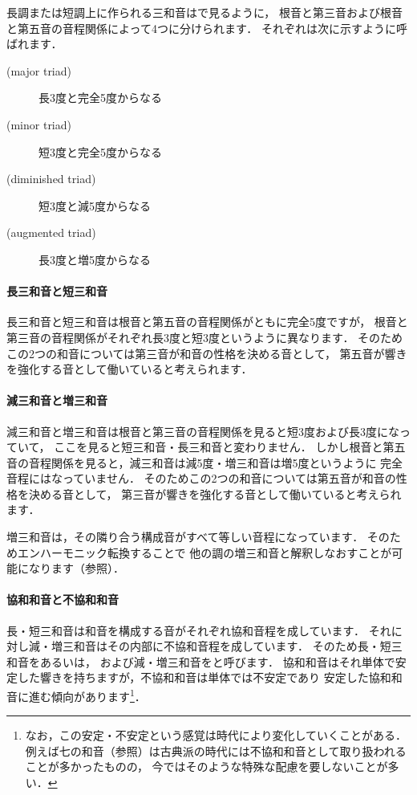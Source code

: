 \documentclass[dvipdfmx,uplatex,b5paper,openany,jbase=12Q,nomag*,textwidth-limit=44%
               ]{gachimuchi}[2020/05/05]
\begin{document}
長調または短調上に作られる三和音はで見るように，
根音と第三音および根音と第五音の音程関係によって4つに分けられます．
それぞれは次に示すように呼ばれます．
\begin{description}
  \item[\xkanjispace(major triad)] 長3度と完全5度からなる
  \item[\xkanjispace(minor triad)] 短3度と完全5度からなる
  \item[\xkanjispace(diminished triad)] 短3度と減5度からなる
  \item[\xkanjispace(augmented triad)] 長3度と増5度からなる
\end{description}

\begin{Music}[0.6\linewidth]
  \nostartrule%
  \Startpiece
  \Notes%
  \en%
  \endpiece
\end{Music}

\paragraph{長三和音と短三和音}
長三和音と短三和音は根音と第五音の音程関係がともに完全5度ですが，
根音と第三音の音程関係がそれぞれ長3度と短3度というように異なります．
そのためこの2つの和音については第三音が和音の性格を決める音として，
第五音が響きを強化する音として働いていると考えられます．

\paragraph{減三和音と増三和音}
減三和音と増三和音は根音と第三音の音程関係を見ると短3度および長3度になっていて，
ここを見ると短三和音・長三和音と変わりません．
しかし根音と第五音の音程関係を見ると，減三和音は減5度・増三和音は増5度というように
完全音程にはなっていません．
そのためこの2つの和音については第五音が和音の性格を決める音として，
第三音が響きを強化する音として働いていると考えられます．

増三和音は，その隣り合う構成音がすべて等しい音程になっています．
そのためエンハーモニック転換することで
他の調の増三和音と解釈しなおすことが可能になります（参照）．

\paragraph{協和和音と不協和和音}
長・短三和音は和音を構成する音がそれぞれ協和音程を成しています．
それに対し減・増三和音はその内部に不協和音程を成しています．
そのため長・短三和音をあるいは，
および減・増三和音をと呼びます．
協和和音はそれ単体で安定した響きを持ちますが，不協和和音は単体では不安定であり
安定した協和和音に進む傾向があります\footnote{%
  なお，この安定・不安定という感覚は時代により変化していくことがある．
  例えば七の和音（参照）は古典派の時代には不協和和音として取り扱われることが多かったものの，
  今ではそのような特殊な配慮を要しないことが多い．
}．
\end{document}

